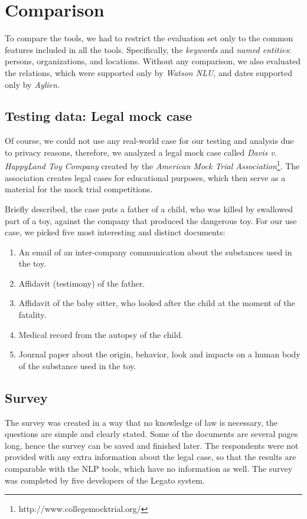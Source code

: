 \documentclass[
  digital, %
  table,   %
  lof,     %
  lot,     %
]{fithesis3}
\begin{document}
\section{Comparison}
To compare the tools, we had to restrict the evaluation set only to the common features included in all the tools.
Specifically, the \textit{keywords} and \textit{named entities}: persons, organizations, and locations.
Without any comparison, we also evaluated the relations, which were supported only by \textit{Watson NLU}, and dates supported only by \textit{Aylien}.

\subsection{Testing data: Legal mock case}
Of course, we could not use any real-world case for our testing and analysis due to privacy reasons, therefore, we analyzed a legal mock case called \textit{Davis v. HappyLand Toy Company}\cite{american2015davis} created by the \textit{American Mock Trial Association}\footnote{http://www.collegemocktrial.org/}. 
The association creates legal cases for educational purposes, which then serve as a material for the mock trial competitions.

Briefly described, the case puts a father of a child, who was killed by swallowed part of a toy, against the company that produced the dangerous toy. For our use case, we picked five most interesting and distinct documents: 
\begin{enumerate}
\item An email of an inter-company communication about the substances used in the toy.
\item Affidavit (testimony) of the father.
\item Affidavit of the baby sitter, who looked after the child at the moment of the fatality.
\item Medical record from the autopsy of the child.
\item Journal paper about the origin, behavior, look and impacts on a human body of the substance used in the toy.
\end{enumerate}

\subsection{Survey}
The survey was created in a way that no knowledge of law is necessary, the questions are simple and clearly stated.
Some of the documents are several pages long, hence the survey can be saved and finished later.
The respondents were not provided with any extra information about the legal case, so that the results are comparable with the NLP tools, which have no information as well.
The survey was completed by five developers of the Legato system.
\end{document}
